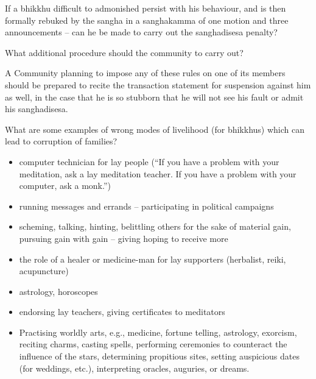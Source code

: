 
If a bhikkhu difficult to admonished persist with his behaviour, and is then
formally rebuked by the sangha in a sanghakamma of one motion and three
announcements – can he be made to carry out the sanghadisesa penalty?

\bigskip

What additional procedure should the community to carry out?

\begin{solution}
  A Community planning to impose any of these rules on one of its members should
  be prepared to recite the transaction statement for suspension against him as
  well, in the case that he is so stubborn that he will not see his fault or
  admit his sanghadisesa.
\end{solution}

\bigskip


What are some examples of wrong modes of livelihood (for bhikkhus) which can lead to corruption of families?

\begin{solution}
  \begin{itemize}

  \item computer technician for lay people (``If you have a problem with your meditation, ask a lay meditation teacher. If you have a problem with your computer, ask a monk.'')

  \item running messages and errands -- participating in political campaigns
  
  \item scheming, talking, hinting, belittling others for the sake of material
    gain, pursuing gain with gain -- giving hoping to receive more

  \item the role of a healer or medicine-man for lay supporters (herbalist, reiki, acupuncture)

  \item astrology, horoscopes

  \item endorsing lay teachers, giving certificates to meditators

  \item Practising worldly arts, e.g., medicine, fortune telling, astrology,
    exorcism, reciting charms, casting spells, performing ceremonies to counteract
    the influence of the stars, determining propitious sites, setting auspicious
    dates (for weddings, etc.), interpreting oracles, auguries, or dreams.
  
  \end{itemize}
\end{solution}


